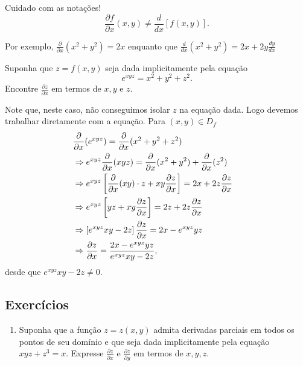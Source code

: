 \begin{remark}
    Cuidado com as notações! \[\frac{\partial f}{\partial x} (x,y) \neq \frac{d}{dx}[f(x,y)].\]

    Por exemplo, \(\frac{\partial}{\partial x} (x^2 + y^2) = 2x\) enquanto que \(\frac{d}{dx} (x^2 + y^2) = 2x + 2y \frac{dy}{dx}\)
\end{remark}

\begin{example}
    Suponha que \(z = f(x,y)\) seja dada implicitamente pela equação \[e^{xyz} = x^2 + y^2 + z^2.\] Encontre \(\frac{\partial z}{\partial x}\) em termos de \(x, y\) e \(z\).

    Note que, neste caso, não conseguimos isolar \(z\) na equação dada. Logo devemos trabalhar diretamente com a equação. Para \((x,y)\in D_f\)
        \begin{align*}
            {\lefteqn{\frac{\partial}{\partial x} (e^{xyz}) = \frac{\partial}{\partial x} (x^2 + y^2 + z^2)}} \\
                & \Rightarrow e^{xyz} \frac{\partial}{\partial x}(xyz) = \frac{\partial}{\partial x}(x^2 + y^2) + \frac{\partial}{\partial x}(z^2) \\
                & \Rightarrow e^{xyz}\left[ \frac{\partial}{\partial x}(xy)\cdot z + xy\frac{\partial z}{\partial x} \right] = 2x + 2z \frac{\partial z}{\partial x} \\
                & \Rightarrow e^{xyz}\left[ yz + xy\frac{\partial z}{\partial x} \right] = 2z + 2z\frac{\partial z}{\partial x} \\
                & \Rightarrow \left[ e^{xyz}xy - 2z \right]\frac{\partial z}{\partial x} = 2x - e^{xyz}yz \\
                & \Rightarrow \frac{\partial z}{\partial x} = \frac{2x - e^{xyz} yz}{e^{xyz} xy - 2z},
        \end{align*}
desde que \(e^{xyz} xy - 2z \neq 0\).
\end{example}

\subsection{Exercícios}

\begin{enumerate}
    \item Suponha que a função $z = z(x,y)$ admita derivadas parciais em todos os pontos de seu domínio e que seja dada implicitamente pela equação $xyz + z^3 = x$. Expresse $\frac{\partial z}{\partial x}$ e $\frac{\partial z}{\partial y}$ em termos de $x, y, z$.
\end{enumerate}


